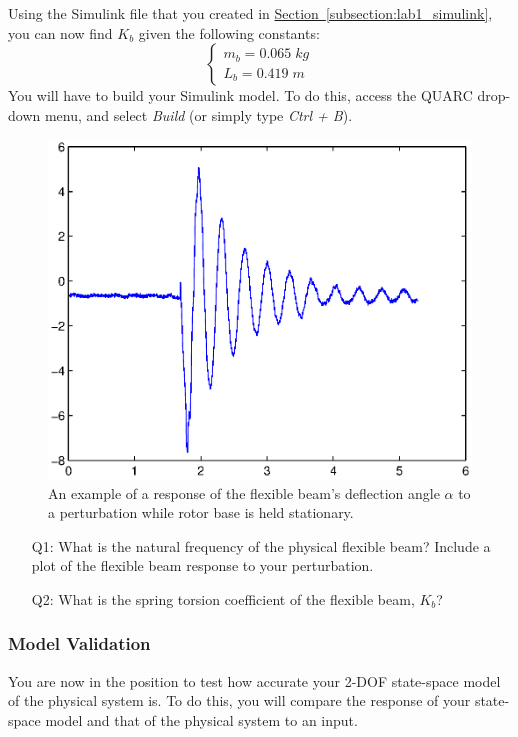 \documentclass[12pt]{report}
\newcommand\drew[1]{\textcolor{red}{#1}}
\begin{document}
Using the Simulink file that you created in \hyperref[subsection:lab1_simulink]{Section~\ref{subsection:lab1_simulink}}, you can now find $K_b$ given the following constants:
\[
    \begin{cases}
        m_b = 0.065 \; kg \\
        L_b = 0.419 \; m
    \end{cases}
\]
You will have to build your Simulink model. To do this, access the QUARC drop-down menu, and select \emph{Build} (or simply type \emph{Ctrl + B}).
\begin{figure}[htb!]
    \centering
    \includegraphics[width=.5\linewidth]{eps/lab_1/perturb.eps}
    \caption{An example of a response of the flexible beam's deflection angle $\alpha$ to a perturbation while rotor base is held stationary.}
    \label{fig:lab1_perturbation_response}
\end{figure}
\begin{enumerate}[Questions]
    \item[Q1:] What is the natural frequency of the physical flexible beam? Include a plot of the flexible beam response to your perturbation.\\
    \item[Q2:] What is the spring torsion coefficient of the flexible beam, $K_b$?\\
\end{enumerate}

\subsubsection{Model Validation}\label{subsubsection:lab1_modelvalidation}
You are now in the position to test how accurate your 2-DOF state-space model of the physical system is. To do this, you will compare the response of your state-space model and that of the physical system to an input.
\end{document}
